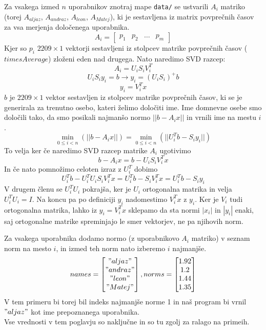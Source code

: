 \documentclass[12pt]{article}
\begin{document}
Za vsakega izmed $n$ uporabnikov znotraj mape \texttt{data/} se ustvarili $A_i$ matriko
(torej $A_{aljaz}$, $A_{andraz}$, $A_{leon}$, $A_{Matej}$), ki je sestavljena iz matrix povprečnih
časov za vsa merjenja določenega uporabnika.
\[
  A_i = \begin{bmatrix}
    p_1 & p_2 & \dots & p_m
  \end{bmatrix}
\]
Kjer so $p_i$ $2209 \times 1$ vektorji sestavljeni iz stolpcev matrike povprečnih časov ($timesAverage$) zloženi
eden nad drugega. Nato naredimo SVD razcep:
$$A_i=U_iS_iV_i^T$$
$$U_iS_iy_i = b \rightarrow y_i = (U_iS_i)^+b$$
$$y_i = V_i^Tx$$
$b$ je $2209 \times 1$ vektor sestavljen iz stolpcev matrike povprečnih časov, ki se je generirala za trenutno osebo, 
kateri želimo določiti ime. Ime domnevne osebe smo določili tako, da smo posikali najmanšo normo $||b-A_ix||$ in vrnili
ime na mestu $i$.
$$\min\limits_{0\le i<n}(||b-A_ix||) = \min\limits_{0\le i<n}(||U_i^Tb-S_iy_i||)$$
To velja ker če naredimo SVD razcep matrike $A_i$ ugotivimo
$$b-A_ix = b-U_iS_iV_i^Tx$$
In če nato pomnožimo celoten izraz z $U_i^T$ dobimo
$$U_i^Tb-U_i^TU_iS_iV_i^Tx = U_i^Tb-S_iV_i^Tx = U_i^Tb-S_iy_i$$
V drugem členu se $U_i^TU_i$ pokrajša, ker je $U_i$ ortogonalna matrika in velja $U_i^TU_i=I$. Na koncu pa 
po definiciji $y_i$ nadomestimo $V_i^Tx$ z $y_i$. Ker je $V_i$ tudi ortogonalna matrika, lahko iz $y_i = V_i^Tx$
sklepamo da sta normi $|x_i|$ in $|y_i|$ enaki, saj ortogonalne matrike spreminjajo le smer vektorjev, ne  
pa njihovih norm.

Za vsakega uporabnika dodamo normo (z uporabnikovo $A_i$ matriko) v seznam norm na mesto $i$, in izmed teh norm nato izberemo
$i$ najmanjše.  
\[
  names = \begin{bmatrix}
    "aljaz"\\
    "andraz"\\
    "leon"\\
    "Matej"
  \end{bmatrix},
  norms = \begin{bmatrix}
    1.92\\
    1.2\\
    1.44\\
    1.35
  \end{bmatrix}
\]
V tem primeru bi torej bil indeks najmanjše norme 1 in naš program bi vrnil $"aljaz"$ kot ime prepoznanega uporabnika.\\
\newline
Vse vrednosti v tem poglavju so naključne in so tu zgolj za ralago na primeih.
\end{document}
